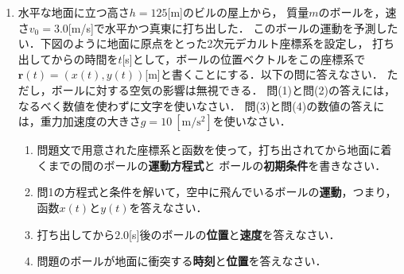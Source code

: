 \documentclass[a4paper,11pt]{ltjsarticle}
\begin{document}
\pagestyle{fancy}
\rhead{}
\cfoot{\thepage}

\begin{enumerate}
    \item 水平な地面に立つ高さ$h=125$[m]のビルの屋上から，
    質量$m$のボールを，速さ$v_0=3.0$[m/s]で水平かつ真東に打ち出した．
    このボールの運動を予測したい．下図のように地面に原点をとった2次元デカルト座標系を設定し，
    打ち出してからの時間を$t$[s]として，ボールの位置ベクトルをこの座標系で
    $\bm{r}(t)=(x(t),y(t))$[m]と書くことにする．以下の問に答えなさい．
    ただし，ボールに対する空気の影響は無視できる．
    問(1)と問(2)の答えには，なるべく数値を使わずに文字を使いなさい．
    問(3)と問(4)の数値の答えには，重力加速度の大きさ$g=10\ [\mathrm{m/s^2}]$を使いなさい．

    \begin{center}
    \end{center}
    
    \begin{enumerate}[label=(\arabic*)]
        \item 問題文で用意された座標系と函数を使って，打ち出されてから地面に着くまでの間のボールの\textbf{運動方程式}と
        ボールの\textbf{初期条件}を書きなさい．

        \item 問1の方程式と条件を解いて，空中に飛んでいるボールの\textbf{運動}，つまり，函数$x(t)$と$y(t)$を答えなさい．
        
        \item 打ち出してから$2.0$[s]後のボールの\textbf{位置}と\textbf{速度}を答えなさい．

        \item 問題のボールが地面に衝突する\textbf{時刻}と\textbf{位置}を答えなさい．
    \end{enumerate}


\end{enumerate}
\end{document}
